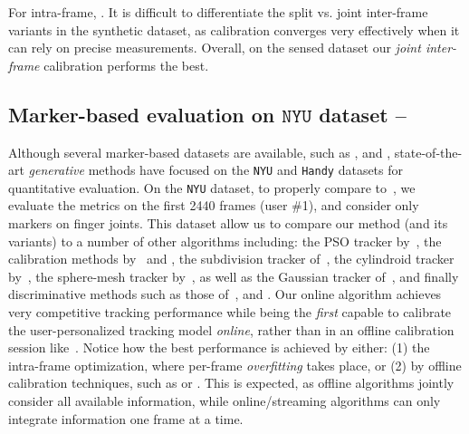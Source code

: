 For intra-frame, .
It is difficult to differentiate the split vs. joint inter-frame variants in the synthetic dataset, as calibration converges very effectively when it can rely on precise measurements. Overall, on the sensed dataset our \emph{joint inter-frame} calibration performs the best.


\subsection{Marker-based evaluation on $\texttt{NYU}$ dataset --
}
\label{sec:evalnyu}
Although several marker-based datasets are available, such as \cite{qian2014realtime}, \cite{sharp2015accurate} and \cite{yuan2017bighand}, state-of-the-art \emph{generative} methods have focused on the \texttt{NYU} \cite{tompson2014real} and \texttt{Handy} \cite{tkach2016sphere} datasets for quantitative evaluation. 
On the \texttt{NYU} dataset, to properly compare to~, we evaluate the metrics on the first 2440 frames (user \#1), and consider only markers on finger joints.
%
This dataset allow us to compare our method (and its variants) to a number of other algorithms including: the PSO tracker by~, the calibration methods by~ and , the subdivision tracker of~, the cylindroid tracker by~, the sphere-mesh tracker by~, as well as the Gaussian tracker of~, and finally discriminative methods such as those of~,  and . 
% 
% 
Our online algorithm achieves very competitive tracking performance while being the \emph{first} capable to calibrate the user-personalized tracking model \emph{online}, rather than in an offline calibration session like~. 
% 
Notice how the best performance is achieved by either: (1) the intra-frame optimization, where per-frame \emph{overfitting} takes place, or (2) by offline calibration techniques, such as \OfflineSoft{} or \cite{taylor2016joint}. This is expected, as offline algorithms jointly consider all available information, while online/streaming algorithms can only integrate information one frame at a time.

